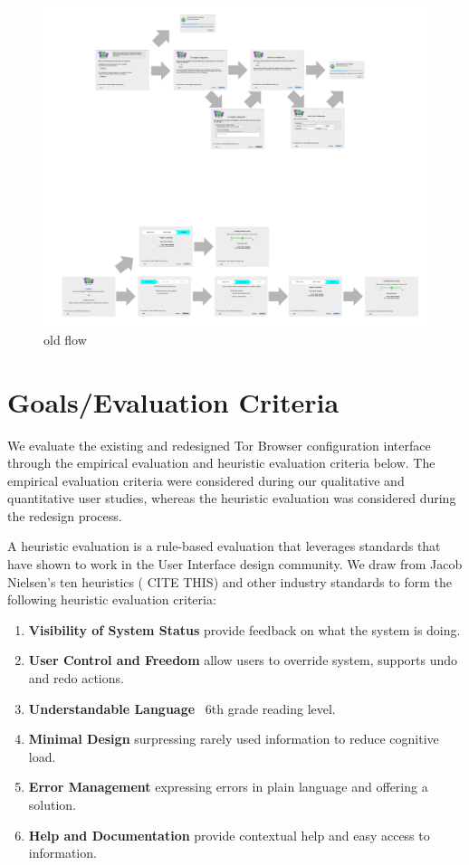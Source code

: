 \documentclass{template}
\begin{document}
\begin{figure}[t]
	\label{fig:old-flow}
	\centering
		\includegraphics[width=1.0\textwidth]{old-flow.pdf} 
		\caption{old flow} 
\end{figure} 

\section{Goals/Evaluation Criteria}
We evaluate the existing and redesigned Tor Browser configuration interface 
through the empirical evaluation and heuristic evaluation criteria below. The
empirical evaluation criteria were considered during our qualitative and 
quantitative user studies, whereas the heuristic evaluation was considered during
the redesign process. 

A heuristic evaluation is a rule-based evaluation that leverages standards
that have shown to work in the User Interface design 
community. We draw from Jacob Nielsen's ten heuristics ({\color {red} CITE THIS})
and other industry standards to form the following heuristic evaluation criteria: 
\begin{enumerate} \itemsep1pt \parskip0pt 
    \item {\bfseries Visibility of System Status} provide feedback on what the system is doing.
    \item {\bfseries User Control and Freedom} allow users to override system, supports undo and redo actions. 
    \item {\bfseries Understandable Language} ~6th grade reading level. 
    \item {\bfseries Minimal Design} surpressing rarely used information to reduce cognitive load. 
    \item {\bfseries Error Management} expressing errors in plain language and offering a solution. 
    \item {\bfseries Help and Documentation} provide contextual help and easy access to information. 
\end{enumerate}
\end{document}
